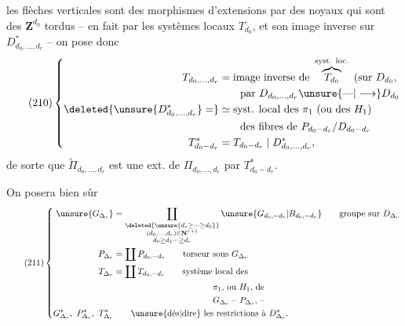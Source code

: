 les flèches verticales sont des morphismes
d'extensions par des noyaux qui sont des $\mathbf Z^{d_0}$
tordus -- en fait par les systèmes locaux
$T_{d_0}$, et son image inverse sur $D^*_{d_0,\ldots,d_r}$ --
on pose donc
\[
\tag{210}
\left\{\begin{aligned}
T_{d_0,\ldots,d_r}&=\text{image inverse de }\overbrace{T_{d_0}}^{\text{syst. loc.}}\text{ (sur }D_{d_0},\\
&\qquad\text{par }D_{d_0,\ldots,d_r}\unsure{\text{---}|\longrightarrow}D_{d_0}\\
\deleted{\unsure{D^*_{d_0,\ldots,d_r}}=}
&\simeq\text{syst. local des }\pi_1\text{ (ou des }H_1\text{)}\\
&\qquad\text{des fibres de }P_{d_0- d_r}/D_{d_0- d_r}\\
T^*_{d_0- d_r}&=T_{d_0- d_r}\mid D^*_{d_0,\ldots,d_r},
\end{aligned}\right.
\]
de sorte que $\widetilde\Pi_{d_0,\ldots,d_r}$ est une ext. de
$\Pi_{d_0,\ldots,d_r}$ par $T^*_{d_0- d_r}$.

On posera bien sûr
\deleted{\[
\unsure{\widetilde\Pi_{*\Delta_r}|\Pi_{\Delta_r}}=\coprod\Pi_{d_0,\ldots,d_r}
\]}
\[
\tag{211}
\left\{\begin{aligned}
\unsure{G_{\Delta_r}}&=
\coprod_{\substack{\deleted{\unsure{d_r\geq\cdots\geq d_0}}\\(d_0,\ldots,d_r)\in\mathbf N^{r+1}\\d_0\geq d_1\cdots\geq d_r}}
\unsure{G_{d_0,-d_r}|B_{d_0,-d_r}}\qquad\text{groupe sur }D_{\Delta_r}\\
P_{\Delta_r}&=\coprod P_{d_0,-d_r}\qquad\text{torseur sous }G_{\Delta_r}\\
T_{\Delta_r}&=\coprod T_{d_0,-d_r}\qquad\text{système local des}\\
&\hspace{4cm}\pi_1\text{, ou }H_1\text{, de}\\
&\hspace{4cm}G_{\Delta_r}\text{ -- }P_{\Delta_r}\text{, --}\\
G^*_{\Delta_r},\ P^*_{\Delta_r},\ T^*_{\Delta_r}&\qquad\unsure{\text{dés}|\text{dire}}\ \text{les restrictions à }D^*_{\Delta_r}.
\end{aligned}\right.
\]
